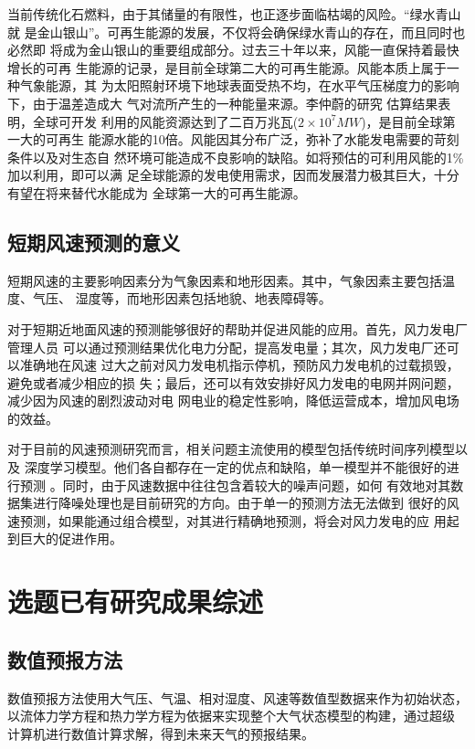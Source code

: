 \documentclass[AutoFakeBold]{LZUThesis}
\begin{document}
当前传统化石燃料，由于其储量的有限性，也正逐步面临枯竭的风险。“绿水青山就
是金山银山”。可再生能源的发展，不仅将会确保绿水青山的存在，而且同时也必然即
将成为金山银山的重要组成部分。过去三十年以来，风能一直保持着最快增长的可再
生能源的记录，是目前全球第二大的可再生能源。风能本质上属于一种气象能源，其
为太阳照射环境下地球表面受热不均，在水平气压梯度力的影响下，由于温差造成大
气对流所产生的一种能量来源。李仲蔚的研究
\cite{李仲蔚2019风力发电企业价值评估研究}估算结果表明，全球可开发
利用的风能资源达到了二百万兆瓦($2\times10^7MW$)，是目前全球第一大的可再生
能源水能的10倍。风能因其分布广泛，弥补了水能发电需要的苛刻条件以及对生态自
然环境可能造成不良影响的缺陷。如将预估的可利用风能的1\%加以利用，即可以满
足全球能源的发电使用需求，因而发展潜力极其巨大，十分有望在将来替代水能成为
全球第一大的可再生能源。

\subsection{短期风速预测的意义}
短期风速的主要影响因素分为气象因素和地形因素。其中，气象因素主要包括温度、气压、
湿度等，而地形因素包括地貌、地表障碍等。

对于短期近地面风速的预测能够很好的帮助并促进风能的应用。首先，风力发电厂管理人员
可以通过预测结果优化电力分配，提高发电量；其次，风力发电厂还可以准确地在风速
过大之前对风力发电机指示停机，预防风力发电机的过载损毁，避免或者减少相应的损
失；最后，还可以有效安排好风力发电的电网并网问题，减少因为风速的剧烈波动对电
网电业的稳定性影响，降低运营成本，增加风电场的效益。

对于目前的风速预测研究而言，相关问题主流使用的模型包括传统时间序列模型以及
深度学习模型。他们各自都存在一定的优点和缺陷，单一模型并不能很好的进行预测
\cite{陆冰鉴2020基于}。同时，由于风速数据中往往包含着较大的噪声问题，如何
有效地对其数据集进行降噪处理也是目前研究的方向。由于单一的预测方法无法做到
很好的风速预测，如果能通过组合模型，对其进行精确地预测，将会对风力发电的应
用起到巨大的促进作用。

\section{选题已有研究成果综述}
\subsection{数值预报方法}
数值预报方法使用大气压、气温、相对湿度、风速等数值型数据来作为初始状态，
以流体力学方程和热力学方程为依据来实现整个大气状态模型的构建，通过超级
计算机进行数值计算求解，得到未来天气的预报结果。
\cite{姜兆宇2019多时空尺度的风力发电预测方法综述}
\end{document}
